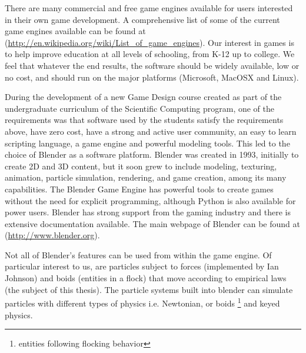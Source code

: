 


There are many commercial and free game engines available for users interested in their own game development. A comprehensive list of some of the current game engines available can be found at (\url{http://en.wikipedia.org/wiki/List\_of\_game\_engines}). Our interest in games is to help improve education at all levels of schooling, from K-12 up to college. We feel that whatever the end results, the software should be widely available, low or no cost, and should run on the major platforms (Microsoft, MacOSX and Linux). 




During the development of a new Game Design course created as part of the undergraduate curriculum of the Scientific Computing program, one of the requirements was that software used by the students satisfy the requirements above, have zero cost, have a strong and active user community, an easy to learn scripting language, a game engine and powerful modeling tools. This led to the choice of Blender as a software platform. Blender was created in 1993, initially to create 2D and 3D content, but it soon grew to include modeling, texturing, animation, particle simulation, rendering, and game creation, among its many capabilities. The Blender Game Engine has powerful tools to create games without the need for explicit programming, although Python is also available for power users. Blender has strong support from the gaming industry and there is extensive documentation available. The main webpage of Blender can be found at (\url{http://www.blender.org}).  


Not all  of Blender's features can be used from within the game engine. Of particular 
interest to us, are particles subject to forces (implemented by Ian Johnson) and 
boids (entities in a flock) that move according to empirical laws (the subject of this
thesis). 
The particle systems built into blender can simulate particles with different types of physics i.e. Newtonian, or boids \footnote{entities following flocking behavior} and keyed physics. 


